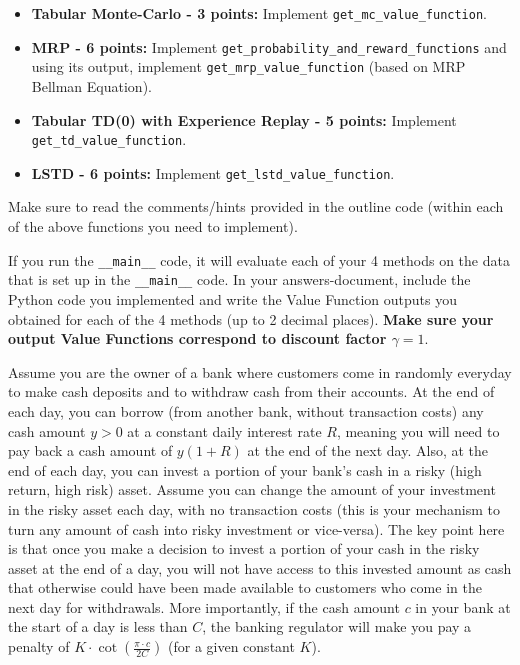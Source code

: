 \documentclass[12pt]{exam}
\begin{document}
\begin{questions}
\begin{itemize}
\item {\bf Tabular Monte-Carlo - 3 points: } Implement \lstinline{get_mc_value_function}.
\item {\bf MRP - 6 points: } Implement \lstinline{get_probability_and_reward_functions} and using its output, implement \lstinline{get_mrp_value_function} (based on MRP Bellman Equation).
\item {\bf Tabular TD(0) with Experience Replay - 5 points: } Implement \lstinline{get_td_value_function}.
\item {\bf LSTD - 6 points: } Implement \lstinline{get_lstd_value_function}.
\end{itemize}

Make sure to read the comments/hints provided in the outline code (within each of the above functions you need to implement).

If you run the \lstinline{__main__} code, it will evaluate each of your 4 methods on the data that is set up in the \lstinline{__main__} code. In your answers-document, include the Python code you implemented and write the Value Function outputs you obtained for each of the 4 methods (up to 2 decimal places). {\bf Make sure your output Value Functions correspond to discount factor $\gamma = 1$}.

\vspace{10mm}


\question Assume you are the owner of a bank where customers come in randomly everyday to make cash deposits and to withdraw cash from their accounts. At the end of each day, you can borrow (from another bank, without transaction costs) any cash amount $y > 0$ at a constant daily interest rate $R$, meaning you will need to pay back a cash amount of $y(1+R)$ at the end of the next day. Also, at the end of each day, you can invest a portion of your bank's cash in a risky (high return, high risk) asset. Assume you can change the amount of your investment in the risky asset each day, with no transaction costs (this is your mechanism to turn any amount of cash into risky investment or vice-versa). The key point here is that once you make a decision to invest a portion of your cash in the risky asset at the end of a day, you will not have access to this invested amount as cash that otherwise could have been made available to customers who come in the next day for withdrawals. More importantly, if the cash amount $c$ in your bank at the start of a day is less than $C$, the banking regulator will make you pay a penalty of $K \cdot \cot(\frac {\pi \cdot c}{2C})$ (for a given constant $K$).


\end{questions}
\end{document}
